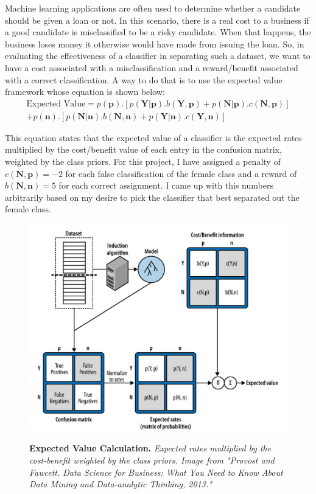 Machine learning applications are often used to determine whether a candidate should be given a loan or not. In this scenario, there is a real cost to a business if a good candidate is misclassified to be a risky candidate. When that happens, the business loses money it otherwise would have made from issuing the loan. So, in evaluating the effectiveness of a  classifier in separating such a dataset, we want to have a cost associated with a misclassification and a reward/benefit associated with a correct classification. A way to do that is to use the expected value framework whose equation is shown below:
\begin{equation}
\begin{aligned}
\mbox{Expected Value} = p(\mathbf{p}).[p(\mathbf{Y}|\mathbf{p}). b(\mathbf{Y},\mathbf{p}) + p(\mathbf{N}|\mathbf{p}). c(\mathbf{N},\mathbf{p})] \\
+ p(\mathbf{n}).[p(\mathbf{N}|\mathbf{n}). b(\mathbf{N},\mathbf{n}) + 
p(\mathbf{Y}|\mathbf{n}). c(\mathbf{Y},\mathbf{n})]
\end{aligned}
\end{equation}

This equation states that the expected value of a classifier is the expected rates multiplied by the cost/benefit value of each entry in the confusion matrix, weighted by the class priors. For this project, I have assigned a penalty of $c(\mathbf{N},\mathbf{p}) = -2$ for each false classification of the female class and a reward of $b(\mathbf{N},\mathbf{n}) = 5$ for each correct assignment. I came up with this numbers arbitrarily based on my desire to pick the classifier that best separated out the female class. 

\begin{figure}[!hbtp]
\centering

    \caption{\textbf{Expected Value Calculation. }\textit{Expected rates multiplied by the cost-benefit weighted by the class priors. Image from "Provost and Fawcett. Data Science for Business: What You Need to Know About Data Mining and Data-analytic Thinking, 2013."}}

    \includegraphics[width=1\textwidth]{figures/expectedValueCalculation.png}
    \label{expectedValue}
\end{figure}


